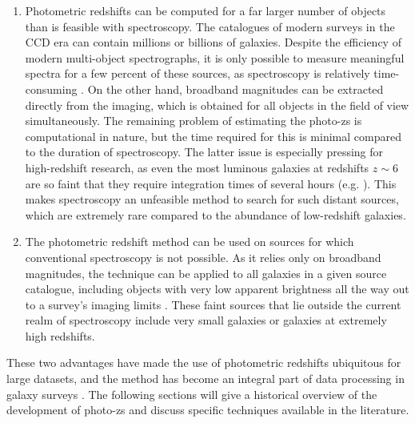 
\begin{enumerate}
    \item Photometric redshifts can be computed for a far larger number of objects than is feasible with spectroscopy. The catalogues of modern surveys in the CCD era can contain millions or billions of galaxies. Despite the efficiency of modern multi-object spectrographs, it is only possible to measure meaningful spectra for a few percent of these sources, as spectroscopy is relatively time-consuming \citep{2005A&A...439..845L,2019NatAs...3..212S}. On the other hand, broadband magnitudes can be extracted directly from the imaging, which is obtained for all objects in the field of view simultaneously. The remaining problem of estimating the photo-zs is computational in nature, but the time required for this is minimal compared to the duration of spectroscopy. The latter issue is especially pressing for high-redshift research, as even the most luminous galaxies at redshifts $z \sim 6$ are so faint that they require integration times of several hours (e.g. \citealt{2013AJ....145....4W}). This makes spectroscopy an unfeasible method to search for such distant sources, which are extremely rare compared to the abundance of low-redshift galaxies. 
    
    \item The photometric redshift method can be used on sources for which conventional spectroscopy is not possible. As it relies only on broadband magnitudes, the technique can be applied to all galaxies in a given source catalogue, including objects with very low apparent brightness all the way out to a survey's imaging limits \citep{1998astro.ph..9347Y,2019NatAs...3..212S}. These faint sources that lie outside the current realm of spectroscopy include very small galaxies or galaxies at extremely high redshifts. 
\end{enumerate}

\noindent These two advantages have made the use of photometric redshifts ubiquitous for large datasets, and the method has become an integral part of data processing in galaxy surveys \citep{2013ApJ...775...93D}. The following sections will give a historical overview of the development of photo-zs and discuss specific techniques available in the literature. \par


